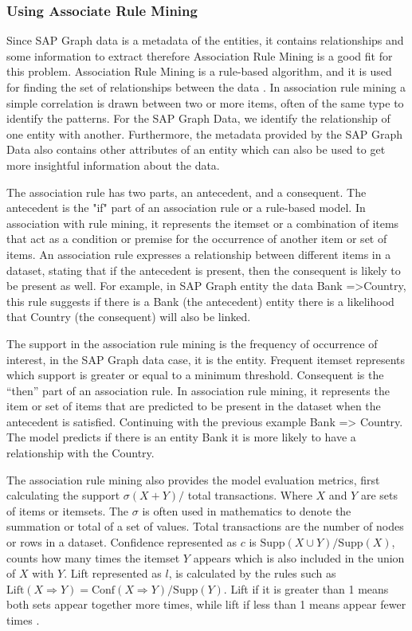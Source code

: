\documentclass{article}
\begin{document}
\maketitle
\subsubsection{Using Associate Rule Mining}

Since SAP Graph data is a metadata of the entities, it contains relationships and some information to extract therefore Association Rule Mining is a good fit for this problem. Association Rule Mining is a rule-based algorithm, and it is used for finding the set of relationships between the data \parencite{kumbhare2014}. In association rule mining a simple correlation is drawn between two or more items, often of the same type to identify the patterns. For the SAP Graph Data, we identify the relationship of one entity with another. Furthermore, the metadata provided by the SAP Graph Data also contains other attributes of an entity which can also be used to get more insightful information about the data.

The association rule has two parts, an antecedent, and a consequent. The antecedent is the "if" part of an association rule or a rule-based model. In association with rule mining, it represents the itemset or a combination of items that act as a condition or premise for the occurrence of another item or set of items. An association rule expresses a relationship between different items in a dataset, stating that if the antecedent is present, then the consequent is likely to be present as well. For example, in SAP Graph entity the data {Bank} =>{Country}, this rule suggests if there is a Bank (the antecedent) entity there is a likelihood that Country (the consequent) will also be linked.

The support in the association rule mining is the frequency of occurrence of interest, in the SAP Graph data case, it is the entity. Frequent itemset represents which support is greater or equal to a minimum threshold. Consequent is the “then” part of an association rule. In association rule mining, it represents the item or set of items that are predicted to be present in the dataset when the antecedent is satisfied. Continuing with the previous example {Bank} => {Country}. The model predicts if there is an entity Bank it is more likely to have a relationship with the Country.

The association rule mining also provides the model evaluation metrics, first calculating the support $\sigma(X + Y) /$ total transactions. Where $X$ and $Y$ are sets of items or itemsets. The $\sigma$ is often used in mathematics to denote the summation or total of a set of values. Total transactions are the number of nodes or rows in a dataset. Confidence represented as $c$ is $\text{Supp}(X \cup Y) / \text{Supp}(X)$, counts how many times the itemset $Y$ appears which is also included in the union of $X$ with $Y$. Lift represented as $l$, is calculated by the rules such as $\text{Lift}(X \Rightarrow Y) = \text{Conf}(X \Rightarrow Y) / \text{Supp}(Y)$. Lift if it is greater than 1 means both sets appear together more times, while lift if less than 1 means appear fewer times \parencite{kumbhare2014}.
\end{document}
